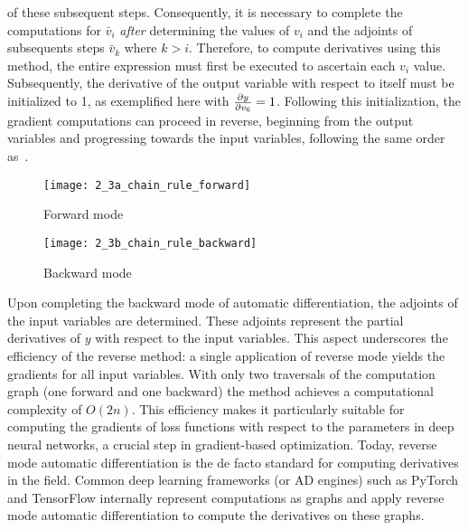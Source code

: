 of these subsequent steps. Consequently, it is necessary to complete the
computations for $\bar{v}_i$ \emph{after} determining the values of $v_i$ and
the adjoints of subsequents steps $\bar{v}_k$ where $k > i$. Therefore, to
compute derivatives using this method, the entire expression must first be
executed to ascertain each $v_i$ value. Subsequently, the derivative of the
output variable with respect to itself must be initialized to 1, as exemplified
here with $\frac{\partial y}{\partial v_6} = 1$. Following this initialization, the gradient
computations can proceed in reverse, beginning from the output variables and
progressing towards the input variables, following the same order
as~.
\begin{figure*}
    \begin{subfigure}[h]{.5\linewidth}
        \texttt{[image: 2\_3a\_chain\_rule\_forward]}
        \caption{Forward mode}
        \label{fig:3a}
    \end{subfigure}%
    \begin{subfigure}[h]{0.5\linewidth}
        \texttt{[image: 2\_3b\_chain\_rule\_backward]}
        \caption{Backward mode}
        \label{fig:3b}
    \end{subfigure}
    \caption[Chain Rule Forward-Backward Graph]{
        Graphically, interpreting the chain rule in forward mode involves
        propagating gradients from inputs to outputs. Subfigure~\ref{fig:3a}
        visually illustrates this process, showing how node $v_i$ transmits its
        derivative to the subsequent node $v_j$. Conversely, the backward mode
        entails the propagation of gradients from outputs back to inputs, as
        depicted in subfigure~\ref{fig:3b}. This graphical interpretation also
        clarifies how the automatic differentiation (AD) algorithm functions:
        to compute the derivative of a variable $u$ with respect to another
        variable $t$, it simply involves multiplying the gradients that appear
        along the path from $u$ to $t$.
    }
\end{figure*}

Upon completing the backward mode of automatic differentiation, the adjoints of
the input variables are determined. These adjoints represent the partial
derivatives of $y$ with respect to the input variables. This aspect underscores
the efficiency of the reverse method: a single application of reverse mode
yields the gradients for all input variables. With only two traversals of the
computation graph (one forward and one backward) the method achieves a
computational complexity of $O(2n)$. This efficiency makes it particularly
suitable for computing the gradients of loss functions with respect to the
parameters in deep neural networks, a crucial step in gradient-based optimization. Today,
reverse mode automatic differentiation is the de facto standard for computing
derivatives in the field. Common deep learning frameworks (or AD engines) such
as PyTorch  and TensorFlow 
internally represent computations as graphs and apply reverse mode automatic
differentiation to compute the derivatives on these graphs.

